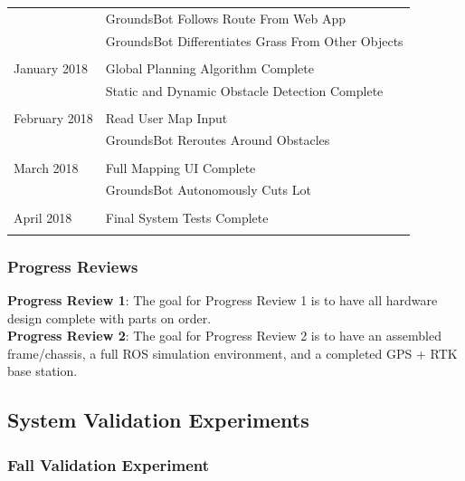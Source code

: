 \documentclass[12pt]{extarticle}
\begin{document}
\begin{table}[H]
\begin{tabular}{ll}
    &GroundsBot Follows Route From Web App       \\
    &GroundsBot Differentiates Grass From Other Objects \\
                                            \\
                                            
January 2018

    &Global Planning Algorithm Complete          \\
    &Static and Dynamic Obstacle Detection Complete\\
                                               \\
February 2018
  
    &Read User Map Input                        \\
    &GroundsBot Reroutes Around Obstacles       \\
                                              \\
March 2018 
  
    &Full Mapping UI Complete                   \\
    &GroundsBot Autonomously Cuts Lot           \\
                                              \\
April 2018 

    &Final System Tests Complete                \\                                            \\
\end{tabular}

\end{table}

\subsubsection{Progress Reviews}
\noindent
\textbf{Progress Review 1}: The goal for Progress Review 1 is to have all hardware design complete with parts on order. \\
 \textbf{Progress Review 2}: The goal for Progress Review 2 is to have an assembled frame/chassis, a full ROS simulation environment, and a completed GPS + RTK base station.\\

\subsection{System Validation Experiments}
\subsubsection{Fall Validation Experiment}
\end{document}
